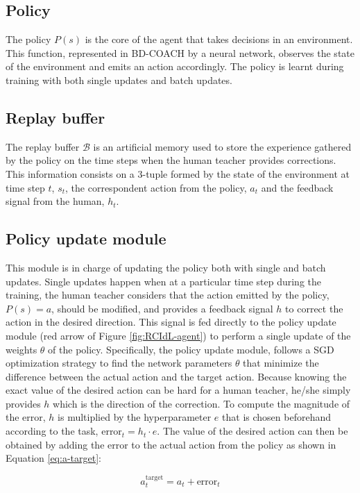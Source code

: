 \subsection*{Policy}

The policy $P(s)$ is the core of the agent that takes decisions in an environment. This function, represented in BD-COACH by a neural network, observes the state of the environment and emits an action accordingly. The policy is learnt during training with both single updates and batch updates. 


\subsection*{Replay buffer}
The replay buffer $\mathcal{B}$ is an artificial memory  used to store the experience gathered by the policy on the time steps when the human teacher provides corrections. This information consists on a 3-tuple formed by the state of the environment at time step $t$,  $s_t$, the correspondent action from the policy, $a_t$ and the feedback signal from the human, $h_t$. 

\subsection*{Policy update module}
This module is in charge of updating the policy both with single and batch updates.
Single updates happen when at a particular time step during the training, the human teacher considers that the action emitted by the policy, $P(s) = a$, should be modified, and provides a feedback signal $h$ to correct the action in the desired direction. This signal is fed directly to the policy update module (red arrow of Figure \ref{fig:RCIdL-agent}) to perform a single update of the weights $\theta$ of the policy. Specifically, the policy update module, follows a SGD optimization strategy to find the network parameters $\theta$ that minimize the difference between the actual action and the target action. Because knowing the exact value of the desired action can be hard for a human teacher, he/she simply provides $h$ which is the direction of the correction. To compute the magnitude of the error, $h$ is multiplied by the hyperparameter $e$ that is chosen beforehand according to the task, $\text{error}_t = h_t \cdot  e$. The value of the desired action can then be obtained by adding the error to the actual action from the policy as shown in Equation \eqref{eq:a-target}:

\begin{equation}
a^\text{target}_t = a_t + \text{error}_t
\label{eq:a-target}
\end{equation}


